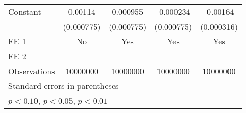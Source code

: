 {\begin{tabular}{l*{4}{c}}
\addlinespace
Constant            &     0.00114         &    0.000955         &   -0.000234         &    -0.00164\sym{***}\\
                    &  (0.000775)         &  (0.000775)         &  (0.000775)         &  (0.000316)         \\
\midrule
FE 1                &          No         &         Yes         &         Yes         &         Yes         \\
FE 2                &                     &                     &                     &                     \\
Observations        &    10000000         &    10000000         &    10000000         &    10000000         \\
\bottomrule
\multicolumn{5}{l}{\footnotesize Standard errors in parentheses}\\
\multicolumn{5}{l}{\footnotesize \sym{*} \(p<0.10\), \sym{**} \(p<0.05\), \sym{***} \(p<0.01\)}\\
\end{tabular}
}
